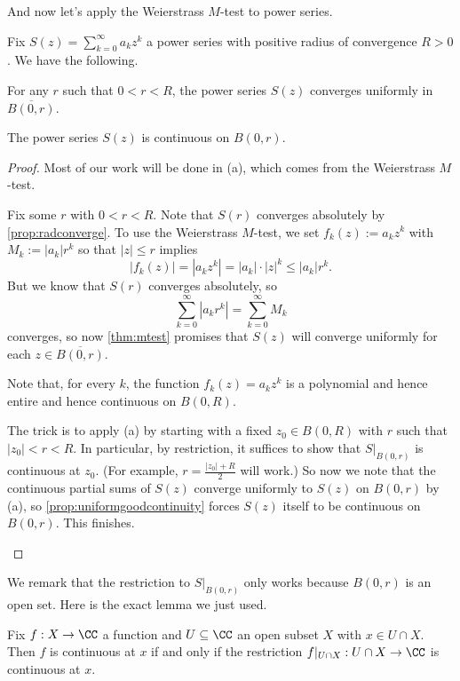 And now let's apply the Weierstrass $M$-test to power series.
\begin{corollary}
	Fix $S(z)=\sum_{k=0}^\infty a_kz^k$ a power series with positive radius of convergence $R>0$. We have the following.
	\begin{listalph}
		\item For any $r$ such that $0<r<R$, the power series $S(z)$ converges uniformly in $\overline{B(0,r)}$.
		\item The power series $S(z)$ is continuous on $B(0,r)$.
	\end{listalph}
\end{corollary}
\begin{proof}
	Most of our work will be done in (a), which comes from the Weierstrass $M$-test.
	\begin{listalph}
		\item Fix some $r$ with $0<r<R$. Note that $S(r)$ converges absolutely by \autoref{prop:radconverge}. To use the Weierstrass $M$-test, we set $f_k(z):=a_kz^k$ with $M_k:=|a_k|r^k$ so that $|z|\le r$ implies
		\[|f_k(z)|=\left|a_kz^k\right|=|a_k|\cdot|z|^k\le|a_k|r^k.\]
		But we know that $S(r)$ converges absolutely, so
		\[\sum_{k=0}^\infty\left|a_kr^k\right|=\sum_{k=0}^\infty M_k\]
		converges, so now \autoref{thm:mtest} promises that $S(z)$ will converge uniformly for each $z\in\overline{B(0,r)}$.

		\item Note that, for every $k$, the function $f_k(z)=a_kz^k$ is a polynomial and hence entire and hence continuous on $B(0,R)$.

		The trick is to apply (a) by starting with a fixed $z_0\in B(0,R)$ with $r$ such that $|z_0|<r<R$. In particular, by restriction, it suffices to show that $S|_{B(0,r)}$ is continuous at $z_0$. (For example, $r=\frac{|z_0|+R}2$ will work.) So now we note that the continuous partial sums of $S(z)$ converge uniformly to $S(z)$ on $B(0,r)$ by (a), so \autoref{prop:uniformgoodcontinuity} forces $S(z)$ itself to be continuous on $B(0,r)$. This finishes.
		\qedhere
	\end{listalph}
\end{proof}
We remark that the restriction to $S|_{B(0,r)}$ only works because $B(0,r)$ is an open set. Here is the exact lemma we just used.
\begin{lemma} \label{lem:restrictcont}
	Fix $f:X\to\CC$ a function and $U\subseteq\CC$ an open subset $X$ with $x\in U\cap X$. Then $f$ is continuous at $x$ if and only if the restriction $f|_{U\cap X}:U\cap X\to\CC$ is continuous at $x$.
\end{lemma}
